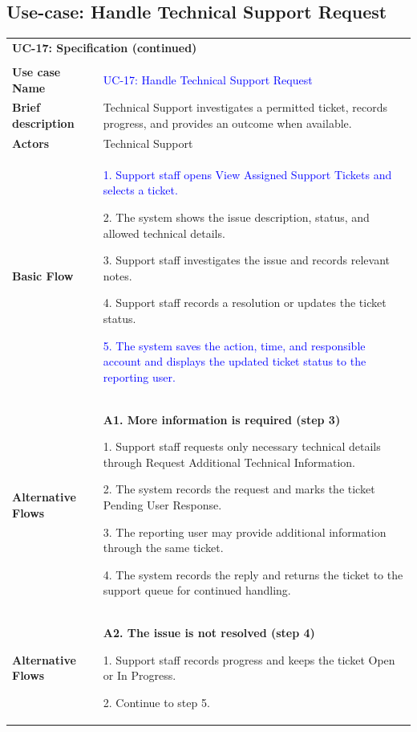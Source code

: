 \subsection{Use-case: Handle Technical Support Request}
\label{uc:uc-17}
\begin{longtable}{|p{}|p{}|}
\hline
\endfirsthead
\multicolumn{2}{l}{\textbf{UC-17: Specification (continued)}}\\\\
\hline
\endhead
\textbf{Use case Name} &
\textcolor{blue}{UC-17: Handle Technical Support Request}
\\ \hline
\textbf{Brief description} &
Technical Support investigates a permitted ticket, records progress, and provides an outcome when available.
\\ \hline
\textbf{Actors} & Technical Support \\ \hline
\textbf{Basic Flow} &
\textcolor{blue}{1. Support staff opens View Assigned Support Tickets and selects a ticket.}\par
2. The system shows the issue description, status, and allowed technical details.\par
3. Support staff investigates the issue and records relevant notes.\par
4. Support staff records a resolution or updates the ticket status.\par
\textcolor{blue}{5. The system saves the action, time, and responsible account and displays the updated ticket status to the reporting user.}
\\ \hline
\textbf{Alternative Flows} &
\textbf{A1. More information is required (step 3)}\par
1. Support staff requests only necessary technical details through Request Additional Technical Information.\par
2. The system records the request and marks the ticket Pending User Response.\par
3. The reporting user may provide additional information through the same ticket.\par
4. The system records the reply and returns the ticket to the support queue for continued handling.
\\ \hline
\textbf{Alternative Flows} &
\textbf{A2. The issue is not resolved (step 4)}\par
1. Support staff records progress and keeps the ticket Open or In Progress.\par
2. Continue to step 5.
\\ \hline

\end{longtable}
